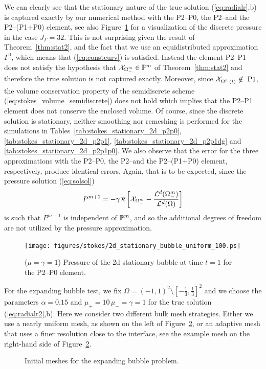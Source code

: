 We can clearly see that the stationary nature of the true solution
(\ref{eq:radialr},b) is captured exactly by our numerical method with the
P2--P0, the P2--\pdg and the P2--(P1+P0) element, see also
Figure~\ref{fig:2d_stationary_bubble} for a visualization of the discrete
pressure in the case $J_\Gamma = 32$. This is not surprising given the
result of Theorem~\ref{thm:stat2}, and the fact that we use an equidistributed
approximation $\Gamma^0$, which means that (\ref{eq:constcurv}) is satisfied.
Instead the element P2--P1 does not satisfy the hypothesis that
$\mathrm{\mathcal{X}}_{\Omega^m_-}\in\mathbb{P}^m$ of Theorem~\ref{thm:stat2} and therefore the
true solution is not captured exactly. Moreover, since
$\mathrm{\mathcal{X}}_{\Omega_-^h(t)}\not\in \mbox{ P1}$, the volume conservation property
of the semidiscrete scheme (\ref{eq:stokes_volume_semidiscrete}) does not hold
which implies that the P2--P1 element does not conserve the enclosed volume. Of
course, since the discrete solution is stationary, neither smoothing nor
remeshing is performed for the simulations in
Tables~\ref{tab:stokes_stationary_2d_p2p0},
\ref{tab:stokes_stationary_2d_p2p1}, \ref{tab:stokes_stationary_2d_p2p1dg} and
\ref{tab:stokes_stationary_2d_p2p1p0}. We also observe that the error for the
three approximations with the P2--P0, the P2--\pdg and the P2--(P1+P0)
element, respectively, produce identical errors. Again, that is to be expected,
since the pressure solution (\ref{eq:solsol})
\begin{equation*}
P^{m+1} = -\gamma\,\overline\kappa\left[\mathrm{\mathcal{X}}_{\Omega_-^m}
- \frac{\mathcal{L}^d(\Omega_-^m)}{\mathcal{L}^d(\Omega)}\right]
\end{equation*}
is such that $P^{m+1}$ is independent of $\mathbb{P}^m$, and so the additional
degrees of freedom are not utilized by the pressure approximation.
\begin{figure}[htbp]
\centering
\texttt{[image: figures/stokes/2d\_stationary\_bubble\_uniform\_100.ps]}
\caption[Stokes 2d stationary bubble pressure]
{($\mu=\gamma=1$) Pressure of the 2d stationary bubble at time $t=1$
for the P2--P0 element.}
\label{fig:2d_stationary_bubble}
\end{figure}

For the expanding bubble test, we fix $\Omega = (-1,1)^2 \setminus
[-\frac13,\frac13]^2$ and we choose the parameters $\alpha = 0.15$ and $\mu_+ =
10\,\mu_- = \gamma = 1$ for the true solution (\ref{eq:radialr2},b). Here we
consider two different bulk mesh strategies. Either we use a nearly uniform
mesh, as shown on the left of Figure~\ref{fig:meshes_expanding}, or an adaptive
mesh that uses a finer resolution close to the interface, see the example mesh
on the right-hand side of Figure~\ref{fig:meshes_expanding}.
\begin{figure}[htbp]
\centering
{}
\caption[Stokes 2d expanding bubble initial meshes]
{Initial meshes for the expanding bubble problem.}
\label{fig:meshes_expanding}
\end{figure}


